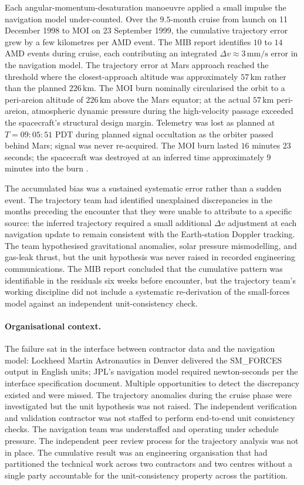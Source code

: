 Each angular-momentum-desaturation manoeuvre applied a small
impulse the navigation model under-counted. Over the $9.5$-month
cruise from launch on 11 December 1998 to MOI on 23 September
1999, the cumulative trajectory error grew by a few kilometres
per AMD event. The MIB report identifies $10$ to $14$ AMD events
during cruise, each contributing an integrated
$\Delta v \approx 3\,\si{\milli\meter\per\second}$ error in the
navigation model. The trajectory error at Mars approach reached
the threshold where the closest-approach altitude was
approximately $57\,\si{\kilo\meter}$ rather than the planned
$226\,\si{\kilo\meter}$. The MOI burn nominally circularised the
orbit to a peri-areion altitude of $226\,\si{\kilo\meter}$ above
the Mars equator; at the actual $57\,\si{\kilo\meter}$
peri-areion, atmospheric dynamic pressure during the
high-velocity passage exceeded the spacecraft's structural
design margin. Telemetry was lost as planned at $T = 09{:}05{:}51$
PDT during planned signal occultation as the orbiter passed
behind Mars; signal was never re-acquired. The MOI burn lasted
$16$ minutes $23$ seconds; the spacecraft was destroyed at an
inferred time approximately $9$ minutes into the burn
\cite{acc:nasa-mco-mib}.

The accumulated bias was a sustained systematic error rather
than a sudden event. The trajectory team had identified
unexplained discrepancies in the months preceding the encounter
that they were unable to attribute to a specific source: the
inferred trajectory required a small additional $\Delta v$
adjustment at each navigation update to remain consistent with
the Earth-station Doppler tracking. The team hypothesised
gravitational anomalies, solar pressure mismodelling, and
gas-leak thrust, but the unit hypothesis was never raised in
recorded engineering communications. The MIB report concluded
that the cumulative pattern was identifiable in the residuals
six weeks before encounter, but the trajectory team's working
discipline did not include a systematic re-derivation of the
small-forces model against an independent unit-consistency
check.

\paragraph{Organisational context.} The failure sat in the interface
between contractor data and the navigation model: Lockheed Martin
Astronautics in Denver delivered the SM\_FORCES output in English
units; JPL's navigation model required newton-seconds per the
interface specification document. Multiple opportunities to detect
the discrepancy existed and were missed. The trajectory anomalies
during the cruise phase were investigated but the unit hypothesis
was not raised. The independent verification and validation
contractor was not staffed to perform end-to-end unit consistency
checks. The navigation team was understaffed and operating under
schedule pressure. The independent peer review process for the
trajectory analysis was not in place. The cumulative result was an
engineering organisation that had partitioned the technical work
across two contractors and two centres without a single party
accountable for the unit-consistency property across the partition.

